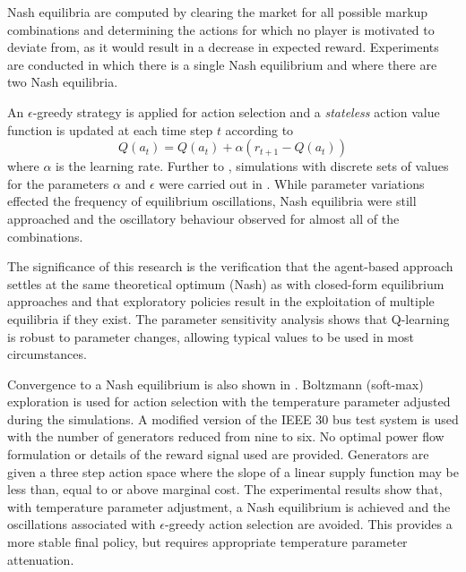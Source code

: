 Nash equilibria are computed by clearing the market for all possible markup
combinations and determining the actions for which no player is motivated to
deviate from, as it would result in a decrease in expected reward. Experiments
are conducted in which there is a single Nash equilibrium and where there are
two Nash equilibria.

An $\epsilon$-greedy strategy \cite{suttonbarto:1998} is applied for action
selection and a \textit{stateless} action value function is updated at each time
step $t$ according to
\begin{equation}
Q(a_t) = Q(a_t) + \alpha(r_{t+1} - Q(a_t))
\end{equation}
where $\alpha$ is the learning rate.  Further to ,
simulations with discrete sets of values for the parameters $\alpha$ and
$\epsilon$ were carried out in .  While parameter
variations effected the frequency of equilibrium oscillations, Nash equilibria
were still approached and the oscillatory behaviour observed for almost all
of the combinations.

The significance of this research is the verification that the agent-based
approach settles at the same theoretical optimum (Nash) as with closed-form
equilibrium approaches and that exploratory policies result in the exploitation
of multiple equilibria if they exist. The parameter sensitivity analysis shows
that Q-learning is robust to parameter changes, allowing typical values to be
used in most circumstances.

Convergence to a Nash equilibrium is also shown in . Boltzmann
(soft-max) exploration is used for action selection with the temperature
parameter adjusted during the simulations.  A modified version of the IEEE 30
bus test system is used with the number of generators reduced from nine to six.
No optimal power flow formulation or details of the reward signal used are
provided.  Generators are given a three step action space where the slope of a
linear supply function may be less than, equal to or above marginal cost.  The
experimental results show that, with temperature parameter adjustment, a Nash
equilibrium is achieved and the oscillations associated with $\epsilon$-greedy
action selection are avoided. This provides a more stable final policy, but
requires appropriate temperature parameter attenuation.


